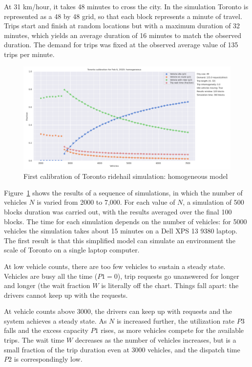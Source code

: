 \documentclass[
  letterpaper,
]{article}
\begin{document}
At 31 km/hour, it takes 48 minutes to cross the city. In the simulation
Toronto is represented as a 48 by 48 grid, so that each block represents
a minute of travel. Trips start and finish at random locations but with
a maximum duration of 32 minutes, which yields an average duration of 16
minutes to match the observed duration. The demand for trips was fixed
at the observed average value of 135 trips per minute.

\begin{figure}

{\centering \includegraphics{toronto_calibration_homogeneous.png}

}

\caption{\label{fig-toronto-homogeneous}First calibration of Toronto
ridehail simulation: homogeneous model}

\end{figure}

Figure~\ref{fig-toronto-homogeneous} shows the results of a sequence of
simulations, in which the number of vehicles \(N\) is varied from 2000
to 7,000. For each value of \(N\), a simulation of 500 blocks duration
was carried out, with the results averaged over the final 100 blocks.
The time for each simulation depends on the number of vehicles: for 5000
vehicles the simulation takes about 15 minutes on a Dell XPS 13 9380
laptop. The first result is that this simplified model can simulate an
environment the scale of Toronto on a single laptop computer.

At low vehicle counts, there are too few vehicles to sustain a steady
state. Vehicles are busy all the time (\(P1 = 0\)), trip requests go
unanswered for longer and longer (the wait fraction \(W\) is literally
off the chart. Things fall apart: the drivers cannot keep up with the
requests.

At vehicle counts above 3000, the drivers can keep up with requests and
the system achieves a steady state. As \(N\) is increased further, the
utilization rate \(P3\) falls and the excess capacity \(P1\) rises, as
more vehicles compete for the available trips. The wait time \(W\)
decreases as the number of vehicles increases, but is a small fraction
of the trip duration even at 3000 vehicles, and the dispatch time \(P2\)
is correspondingly low.
\end{document}
